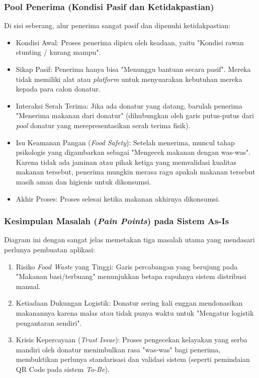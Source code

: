 \subsubsection{Pool Penerima (Kondisi Pasif dan Ketidakpastian)}
Di sisi seberang, alur penerima sangat pasif dan dipenuhi ketidakpastian:
\begin{itemize}
    \item Kondisi Awal: Proses penerima dipicu oleh keadaan, yaitu "Kondisi rawan stunting / kurang mampu".
    \item Sikap Pasif: Penerima hanya bisa "Menunggu bantuan secara pasif". Mereka tidak memiliki alat atau \textit{platform} untuk menyuarakan kebutuhan mereka kepada para calon donatur.
    \item Interaksi Serah Terima: Jika ada donatur yang datang, barulah penerima "Menerima makanan dari donatur" (dihubungkan oleh garis putus-putus dari \textit{pool} donatur yang merepresentasikan serah terima fisik).
    \item Isu Keamanan Pangan (\textit{Food Safety}): Setelah menerima, muncul tahap psikologis yang digambarkan sebagai "Mengecek makanan dengan was-was". Karena tidak ada jaminan atau pihak ketiga yang memvalidasi kualitas makanan tersebut, penerima mungkin merasa ragu apakah makanan tersebut masih aman dan higienis untuk dikonsumsi.
    \item Akhir Proses: Proses selesai ketika makanan akhirnya dikonsumsi.
\end{itemize}

\subsubsection{Kesimpulan Masalah (\textit{Pain Points}) pada Sistem As-Is}
Diagram ini dengan sangat jelas memetakan tiga masalah utama yang mendasari perlunya pembuatan aplikasi:
\begin{enumerate}
    \item Risiko \textit{Food Waste} yang Tinggi: Garis percabangan yang berujung pada "Makanan basi/terbuang" menunjukkan betapa rapuhnya sistem distribusi manual.
    \item Ketiadaan Dukungan Logistik: Donatur sering kali enggan mendonasikan makanannya karena malas atau tidak punya waktu untuk "Mengatur logistik pengantaran sendiri".
    \item Krisis Kepercayaan (\textit{Trust Issue}): Proses pengecekan kelayakan yang serba mandiri oleh donatur menimbulkan rasa "was-was" bagi penerima, membuktikan perlunya standarisasi dan validasi sistem (seperti pemindaian QR Code pada sistem \textit{To-Be}).
\end{enumerate}

